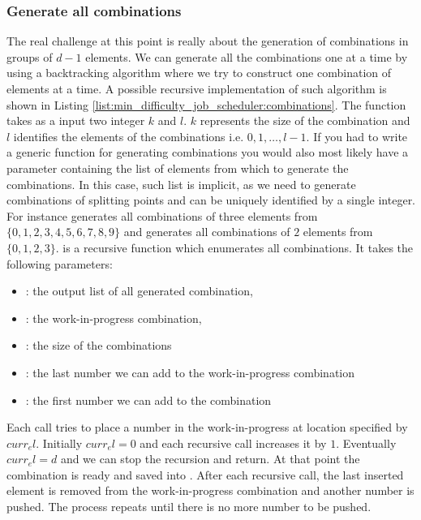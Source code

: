 \subsubsection{Generate all combinations}
The real challenge at this point is really about the generation of combinations in groups of $d-1$
elements. We can generate all the combinations one at a time by using a backtracking algorithm where
we try to construct one combination of elements at a time. A possible recursive implementation of
such algorithm is shown in Listing \ref{list:min_difficulty_job_scheduler:combinations}. The
function  takes as a input two integer $k$ and $l$. $k$ represents
the size of the combination and $l$ identifies the elements of the combinations i.e. $0,1,\ldots,
l-1$. If you had to write a generic function for generating combinations you would also most likely
have a parameter containing the list of elements from which to generate the combinations. In this
case, such list is implicit, as we need to generate combinations of splitting points and can be
uniquely identified by a single integer. For instance 
generates all combinations of three elements from $\{0,1,2,3,4,5,6,7,8,9\}$ and
 generates all combinations of $2$ elements from
$\{0,1,2,3\}$.  is a recursive function which enumerates all
combinations. It takes the following parameters:
\begin{itemize}
    \item {}: the output list of all
    generated combination,
    \item {}: the work-in-progress combination,
    \item {}: the size of the combinations
    \item {}: the last number we can add to the work-in-progress combination
    \item {}: the first number we can add to the combination
\end{itemize}
Each call tries to place a number  in the work-in-progress  at location
specified by $curr_el$. Initially $curr_el = 0$ and each recursive call increases it by $1$.
Eventually $curr_el = d$ and we can stop the recursion and return. At that point the combination is
ready and saved into . After each recursive call, the last inserted element
is removed from the work-in-progress combination and another number is pushed. The process repeats
until there is no more number to be pushed.

